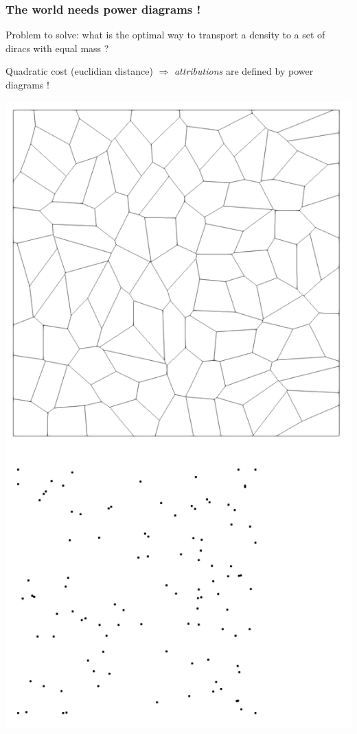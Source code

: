 \documentclass[aspectratio=169]{beamer}
\begin{document}
\begin{frame}
    \frametitle{The world needs power diagrams !}

    \begin{minipage}{0.5\textwidth}
        Problem to solve: what is the optimal way to transport a density to a set of diracs with equal mass ? 
        
        \bigskip
        Quadratic cost (euclidian distance) $\Rightarrow$ \textit{attributions} are defined by power diagrams !
        
        \hfill
    \end{minipage}
    \kern 0.5cm
    \begin{minipage}{0.45\textwidth}
        \begin{center}
            \includegraphics[height=0.8\textheight]{img/pd.png}
        \end{center}
    \end{minipage}
\end{frame}
\end{document}
